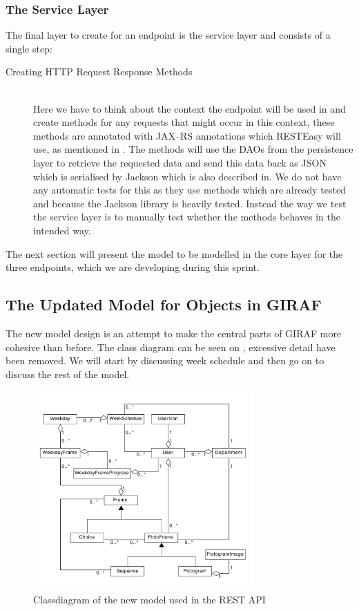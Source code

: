 \subsubsection{The Service Layer}
The final layer to create for an endpoint is the service layer and consists of a single step:
\begin{description}
	\item[Creating HTTP Request Response Methods]\hfill \\
	Here we have to think about the context the endpoint will be used in and create methods for any requests that might occur in this context, these methods are annotated with JAX--RS annotations which RESTEasy will use, as mentioned in .
	The methods will use the DAOs from the persistence layer to retrieve the requested data and send this data back as JSON which is serialised by Jackson which is also described in.
	We do not have any automatic tests for this as they use methods which are already tested and because the Jackson library is heavily tested.
	Instead the way we test the service layer is to manually test whether the methods behaves in the intended way.
\end{description}
\noindent
The next section will present the model to be modelled in the core layer for the three endpoints, which we are developing during this sprint.

\subsection{The Updated Model for Objects in GIRAF}\label{subsec:model}
The new model design is an attempt to make the central parts of GIRAF more cohesive than before.
The class diagram can be seen on , excessive detail have been removed.
We will start by discussing week schedule and then go on to discuss the rest of the model.

\begin{figure}[h]
    \centering
    \includegraphics[width=0.75\textwidth]{figures/fullclassdiagram.pdf}
    \caption{Classdiagram of the new model used in the REST API}\label{fig:fullmodelclassdiagram}
\end{figure}

